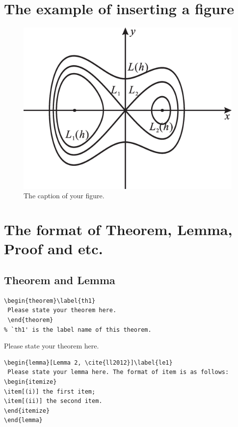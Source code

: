 \documentclass{jaac}
\begin{document}
\section{The example of inserting a figure}
\begin{figure}[h!]
\centering
\includegraphics[scale=0.3]{fig1.eps}
\caption {The caption of your figure.}\label{fig1}
\end{figure}


\section{The  format of Theorem, Lemma, Proof and etc.}
\subsection{Theorem and Lemma}
\begin{verbatim}
\begin{theorem}\label{th1}
 Please state your theorem here.
 \end{theorem}
% `th1' is the label name of this theorem.
 \end{verbatim}

 \begin{theorem}\label{th1}
Please state your theorem here.
\end{theorem}

\begin{verbatim}
\begin{lemma}[Lemma 2, \cite{ll2012}]\label{le1}
 Please state your lemma here. The format of item is as follows:
\begin{itemize}
\item[(i)] the first item;
\item[(ii)] the second item.
\end{itemize}
\end{lemma}
 \end{verbatim}
\end{document}

